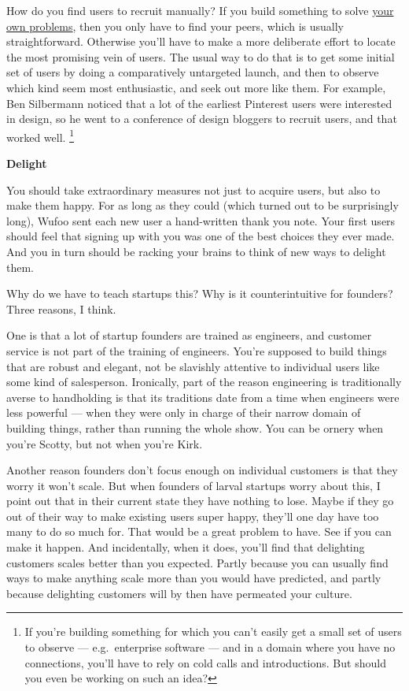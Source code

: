 \documentclass[12pt]{book}
\begin{document}
How do you find users to recruit manually? If you build something to
solve \href{startupideas.html}{your own problems}, then you only have to
find your peers, which is usually straightforward. Otherwise you'll have
to make a more deliberate effort to locate the most promising vein of
users. The usual way to do that is to get some initial set of users by
doing a comparatively untargeted launch, and then to observe which kind
seem most enthusiastic, and seek out more like them. For example, Ben
Silbermann noticed that a lot of the earliest Pinterest users were
interested in design, so he went to a conference of design bloggers to
recruit users, and that worked well. \footnote{If you're building something for which you can't easily get a
small set of users to observe --- e.g.~enterprise software --- and in a
domain where you have no connections, you'll have to rely on cold calls
and introductions. But should you even be working on such an idea?}

\textbf{Delight}

You should take extraordinary measures not just to acquire users, but
also to make them happy. For as long as they could (which turned out to
be surprisingly long), Wufoo sent each new user a hand-written thank you
note. Your first users should feel that signing up with you was one of
the best choices they ever made. And you in turn should be racking your
brains to think of new ways to delight them.

Why do we have to teach startups this? Why is it counterintuitive for
founders? Three reasons, I think.

One is that a lot of startup founders are trained as engineers, and
customer service is not part of the training of engineers. You're
supposed to build things that are robust and elegant, not be slavishly
attentive to individual users like some kind of salesperson. Ironically,
part of the reason engineering is traditionally averse to handholding is
that its traditions date from a time when engineers were less powerful
--- when they were only in charge of their narrow domain of building
things, rather than running the whole show. You can be ornery when
you're Scotty, but not when you're Kirk.

Another reason founders don't focus enough on individual customers is
that they worry it won't scale. But when founders of larval startups
worry about this, I point out that in their current state they have
nothing to lose. Maybe if they go out of their way to make existing
users super happy, they'll one day have too many to do so much for. That
would be a great problem to have. See if you can make it happen. And
incidentally, when it does, you'll find that delighting customers scales
better than you expected. Partly because you can usually find ways to
make anything scale more than you would have predicted, and partly
because delighting customers will by then have permeated your culture.
\end{document}
